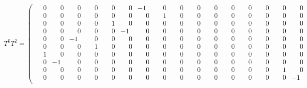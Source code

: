 \documentclass[10pt]{article}
\begin{document}
\[
T^{0}T^{2} = \left(\begin{smallmatrix}
\phantom{-}0 & \phantom{-}0 & \phantom{-}0 & \phantom{-}0 & \phantom{-}0 & \phantom{-}0 & -1 & \phantom{-}0 & \phantom{-}0 & \phantom{-}0 & \phantom{-}0 & \phantom{-}0 & \phantom{-}0 & \phantom{-}0 & \phantom{-}0 & \phantom{-}0 \\
\phantom{-}0 & \phantom{-}0 & \phantom{-}0 & \phantom{-}0 & \phantom{-}0 & \phantom{-}0 & \phantom{-}0 & \phantom{-}1 & \phantom{-}0 & \phantom{-}0 & \phantom{-}0 & \phantom{-}0 & \phantom{-}0 & \phantom{-}0 & \phantom{-}0 & \phantom{-}0 \\
\phantom{-}0 & \phantom{-}0 & \phantom{-}0 & \phantom{-}0 & \phantom{-}1 & \phantom{-}0 & \phantom{-}0 & \phantom{-}0 & \phantom{-}0 & \phantom{-}0 & \phantom{-}0 & \phantom{-}0 & \phantom{-}0 & \phantom{-}0 & \phantom{-}0 & \phantom{-}0 \\
\phantom{-}0 & \phantom{-}0 & \phantom{-}0 & \phantom{-}0 & \phantom{-}0 & -1 & \phantom{-}0 & \phantom{-}0 & \phantom{-}0 & \phantom{-}0 & \phantom{-}0 & \phantom{-}0 & \phantom{-}0 & \phantom{-}0 & \phantom{-}0 & \phantom{-}0 \\
\phantom{-}0 & \phantom{-}0 & -1 & \phantom{-}0 & \phantom{-}0 & \phantom{-}0 & \phantom{-}0 & \phantom{-}0 & \phantom{-}0 & \phantom{-}0 & \phantom{-}0 & \phantom{-}0 & \phantom{-}0 & \phantom{-}0 & \phantom{-}0 & \phantom{-}0 \\
\phantom{-}0 & \phantom{-}0 & \phantom{-}0 & \phantom{-}1 & \phantom{-}0 & \phantom{-}0 & \phantom{-}0 & \phantom{-}0 & \phantom{-}0 & \phantom{-}0 & \phantom{-}0 & \phantom{-}0 & \phantom{-}0 & \phantom{-}0 & \phantom{-}0 & \phantom{-}0 \\
\phantom{-}1 & \phantom{-}0 & \phantom{-}0 & \phantom{-}0 & \phantom{-}0 & \phantom{-}0 & \phantom{-}0 & \phantom{-}0 & \phantom{-}0 & \phantom{-}0 & \phantom{-}0 & \phantom{-}0 & \phantom{-}0 & \phantom{-}0 & \phantom{-}0 & \phantom{-}0 \\
\phantom{-}0 & -1 & \phantom{-}0 & \phantom{-}0 & \phantom{-}0 & \phantom{-}0 & \phantom{-}0 & \phantom{-}0 & \phantom{-}0 & \phantom{-}0 & \phantom{-}0 & \phantom{-}0 & \phantom{-}0 & \phantom{-}0 & \phantom{-}0 & \phantom{-}0 \\
\phantom{-}0 & \phantom{-}0 & \phantom{-}0 & \phantom{-}0 & \phantom{-}0 & \phantom{-}0 & \phantom{-}0 & \phantom{-}0 & \phantom{-}0 & \phantom{-}0 & \phantom{-}0 & \phantom{-}0 & \phantom{-}0 & \phantom{-}0 & \phantom{-}1 & \phantom{-}0 \\
\phantom{-}0 & \phantom{-}0 & \phantom{-}0 & \phantom{-}0 & \phantom{-}0 & \phantom{-}0 & \phantom{-}0 & \phantom{-}0 & \phantom{-}0 & \phantom{-}0 & \phantom{-}0 & \phantom{-}0 & \phantom{-}0 & \phantom{-}0 & \phantom{-}0 & -1 \\

\end{smallmatrix}\]
\end{document}
